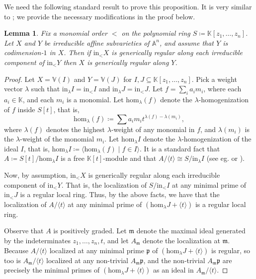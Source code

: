 \documentclass[10pt]{amsart}
\numberwithin{equation}{section}
\newtheorem{lem}[thm]{Lemma}
\theoremstyle{definition}
\theoremstyle{remark}
\newcommand{\1}{^{-1}}
\begin{document}
We need the following standard result to prove this proposition.  It is very similar to \cite[Proposition 3.1 (b)]{BC03}; we provide the necessary modifications in the proof below.

\begin{lem}
Fix a monomial order $<$ on the polynomial ring $S \coloneqq \mathbb{K}[z_1,\dots,z_n]$. 
Let $X$ and $Y$ be irreducible affine subvarieties of $\mathbb{A}^n$, and assume that $Y$ is codimension-$1$ in $X$. 
Then if $\textrm{in}_< X$ is generically regular along each irreducible component of $\textrm{in}_< Y$ then $X$ is generically regular along $Y$.
\end{lem}

\begin{proof}
Let $X = \mathbb{V}(I)$ and $Y = \mathbb{V}(J)$ for $I,J\subseteq \mathbb{K}[z_1,\dots, z_n]$.
Pick a weight vector $\lambda$ such that $\textrm{in}_\lambda I = \textrm{in}_< I$ and $\textrm{in}_\lambda J = \textrm{in}_< J$.
Let $f = \sum_i a_im_i$, where each $a_i\in \mathbb{K}$, and each $m_i$ is a monomial. Let $\textrm{hom}_{\lambda}(f)$ denote the $\lambda$-homogenization of $f$ inside $S[t]$, that is,
\[\textrm{hom}_\lambda(f) \coloneqq \sum a_im_it^{\lambda(f)-\lambda(m_i)},\] where $\lambda(f)$ denotes the highest $\lambda$-weight of any monomial in $f$, and $\lambda(m_i)$ is the $\lambda$-weight of the monomial $m_i$.
Let $\textrm{hom}_\lambda I$ denote the $\lambda$-homogenization of the ideal $I$, that is,
$\textrm{hom}_\lambda I \coloneqq \langle \textrm{hom}_\lambda(f) \mid f\in I \rangle.$ %
It is a standard fact that $A \coloneqq S[t]/\textrm{hom}_{\lambda} I$ is a free $\mathbb{K}[t]$-module and that $A/\langle t\rangle \cong S/\textrm{in}_{\lambda} I$ (see eg. \cite[Proposition 2.4]{BC03} or \cite[Theorem 15.17]{Eis95}).

Now, by assumption, $\textrm{in}_< X$ is generically regular along each irreducible component of $\textrm{in}_< Y$. That is, the localization of $S/\textrm{in}_{<} I$ at any minimal prime of $\textrm{in}_< J$ is a regular local ring. 
Thus, by the above facts, we have that the localization of $A/\langle t\rangle$ at any minimal prime of $(\textrm{hom}_\lambda J+\langle t\rangle)$ is a regular local ring. 

Observe that $A$ is positively graded. Let $\mathfrak{m}$ denote the maximal ideal generated by the indeterminates $z_1,\dots,z_n,t$, and let $A_{\mathfrak{m}}$ denote the localization at $\mathfrak{m}$. 
Because $A/\langle t \rangle$ localized at any minimal prime $\mathfrak{p}$ of $(\textrm{hom}_\lambda J+\langle t\rangle)$ is regular, so too is $A_\mathfrak{m}/\langle t\rangle$ localized at any non-trivial $A_\mathfrak{m} \mathfrak{p}$, and the non-trivial $A_\mathfrak{m}\mathfrak{p}$ are precisely the minimal primes of $(\textrm{hom}_\lambda J+\langle t\rangle)$ as an ideal in $A_\mathfrak{m}/\langle t\rangle$.


\end{proof}
\end{document}
